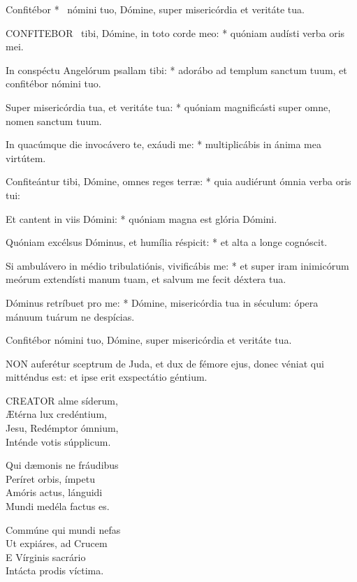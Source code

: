  Confitébor * \textdagger\ nómini tuo, Dómine, super misericórdia et veritáte tua.


\lettrine[lines=2]{C}{ONFITEBOR} \textdagger\ tibi, Dómine, in toto corde meo: * quóniam audísti verba oris mei.

In conspéctu Angelórum psallam tibi: * adorábo ad templum sanctum tuum, et confitébor nómini tuo.

Super misericórdia tua, et veritáte tua: * quóniam magnificásti super omne, nomen sanctum tuum.

In quacúmque die invocávero te, exáudi me: * multiplicábis in ánima mea virtútem.

Confiteántur tibi, Dómine, omnes reges terræ: * quia audiérunt ómnia verba oris tui:

Et cantent in viis Dómini: * quóniam magna est glória Dómini.

Quóniam excélsus Dóminus, et humília réspicit: * et alta a longe cognóscit.

Si ambulávero in médio tribulatiónis, vivificábis me: * et super iram inimicórum meórum extendísti manum tuam, et salvum me fecit déxtera tua.

Dóminus retríbuet pro me: * Dómine, misericórdia tua in séculum: ópera mánuum tuárum ne despícias.

 Confitébor nómini tuo, Dómine, super misericórdia et veritáte tua.



\lettrine[lines=2]{N}{ON} auferétur sceptrum de Juda, et dux de fémore ejus, donec véniat qui mitténdus est: et ipse erit exspectátio géntium.


\lettrine[lines=2]{C}{REATOR} alme síderum,\\
Ætérna lux credéntium,\\
Jesu, Redémptor ómnium,\\
Inténde votis súpplicum.

Qui dæmonis ne fráudibus\\
Períret orbis, ímpetu\\
Amóris actus, lánguidi\\
Mundi medéla factus es.

Commúne qui mundi nefas\\
Ut expiáres, ad Crucem\\
E Vírginis sacrário\\
Intácta prodis víctima.

